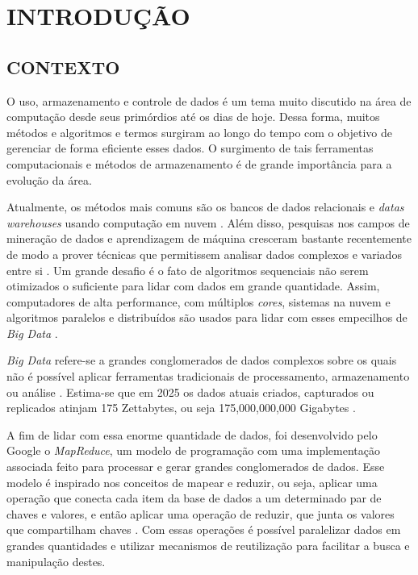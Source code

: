 \chapter{INTRODUÇÃO} \label{cha:introducao}

\section{CONTEXTO} \label{sec:contexto}

O uso, armazenamento e controle de dados é um tema muito discutido na área de computação desde seus primórdios até os dias de hoje. Dessa forma, muitos métodos e algoritmos e termos surgiram ao longo do tempo com o objetivo de gerenciar de forma eficiente esses dados. O surgimento de tais ferramentas computacionais e métodos de armazenamento é de grande importância para a evolução da área.

Atualmente, os métodos mais comuns são os bancos de dados relacionais e \textit{datas warehouses} usando computação em nuvem \cite{PastAndFutureTrendsData19}. Além disso, pesquisas nos campos de mineração de dados e aprendizagem de máquina cresceram bastante recentemente de modo a prover técnicas que permitissem analisar dados complexos e variados entre si \cite{ProgrammingBigData22}. Um grande desafio é o fato de algoritmos sequenciais não serem otimizados o suficiente para lidar com dados em grande quantidade. Assim, computadores de alta performance, com múltiplos \textit{cores}, sistemas na nuvem e algoritmos paralelos e distribuídos são usados para lidar com esses empecilhos de \textit{Big Data} \cite{ProgrammingBigData22}.

\textit{Big Data} refere-se a grandes conglomerados de dados complexos sobre os quais não é possível aplicar ferramentas tradicionais de processamento, armazenamento ou análise \cite{OptmizationSoftwareHadoop18}. Estima-se que em 2025 os dados atuais criados, capturados ou replicados atinjam 175 Zettabytes, ou seja 175,000,000,000 Gigabytes \cite{DigitalizationWorld18}.

A fim de lidar com essa enorme quantidade de dados, foi desenvolvido pelo Google o \textit{MapReduce}, um modelo de programação com uma implementação associada feito para processar e gerar grandes conglomerados de dados. Esse modelo é inspirado nos conceitos de mapear e reduzir, ou seja, aplicar uma operação que conecta cada item da base de dados a um determinado par de chaves e valores, e então aplicar uma operação de reduzir, que junta os valores que compartilham chaves \cite{MapReduce08}. Com essas operações é possível paralelizar dados em grandes quantidades e utilizar mecanismos de reutilização para facilitar a busca e manipulação destes.

